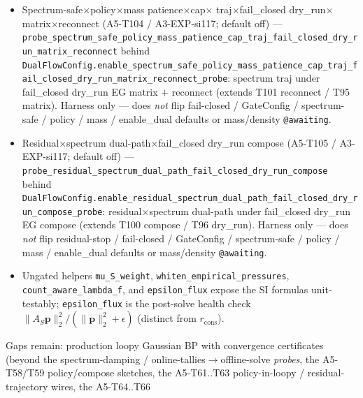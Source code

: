 \documentclass[11pt]{article}
\begin{document}
\begin{itemize}[leftmargin=1.5em]
  traj compose (A5-T103 / A3-EXP-si117; default off) ---
  \texttt{probe\_residual\_spectrum\_dual\_path\_patience\_cap\_traj\_compose}
  behind
  \texttt{DualFlowConfig.enable\_residual\_spectrum\_dual\_path\_patience\_cap\_traj\_compose\_probe}:
  residual$\times$spectrum dual-path patience$\times$cap under traj
  compose (extends T100 fail\_closed compose). Harness only --- does
  \emph{not} flip residual-stop / fail-closed / GateConfig /
  spectrum-safe / policy / mass / enable\_dual defaults or
  mass/density \texttt{@awaiting}.
  \item Spectrum-safe$\times$policy$\times$mass patience$\times$cap$\times$
  traj$\times$fail\_closed dry\_run$\times$matrix$\times$reconnect
  (A5-T104 / A3-EXP-si117; default off) ---
  \texttt{probe\_spectrum\_safe\_policy\_mass\_patience\_cap\_traj\_fail\_closed\_dry\_run\_matrix\_reconnect}
  behind
  \texttt{DualFlowConfig.enable\_spectrum\_safe\_policy\_mass\_patience\_cap\_traj\_fail\_closed\_dry\_run\_matrix\_reconnect\_probe}:
  spectrum traj under fail\_closed dry\_run EG matrix $+$ reconnect
  (extends T101 reconnect / T95 matrix). Harness only --- does
  \emph{not} flip fail-closed / GateConfig / spectrum-safe / policy /
  mass / enable\_dual defaults or mass/density \texttt{@awaiting}.
  \item Residual$\times$spectrum dual-path$\times$fail\_closed dry\_run
  compose (A5-T105 / A3-EXP-si117; default off) ---
  \texttt{probe\_residual\_spectrum\_dual\_path\_fail\_closed\_dry\_run\_compose}
  behind
  \texttt{DualFlowConfig.enable\_residual\_spectrum\_dual\_path\_fail\_closed\_dry\_run\_compose\_probe}:
  residual$\times$spectrum dual-path under fail\_closed dry\_run EG
  compose (extends T100 compose / T96 dry\_run). Harness only --- does
  \emph{not} flip residual-stop / fail-closed / GateConfig /
  spectrum-safe / policy / mass / enable\_dual defaults or
  mass/density \texttt{@awaiting}.
  \item Ungated helpers \texttt{mu\_S\_weight}, \texttt{whiten\_empirical\_pressures},
  \texttt{count\_aware\_lambda\_f}, and \texttt{epsilon\_flux} expose the SI
  formulas unit-testably; \texttt{epsilon\_flux} is the post-solve health check
  $\|A_S\mathbf p\|_2^2/(\|\mathbf p\|_2^2+\epsilon)$ (distinct from
  $r_{\mathrm{cons}}$).
\end{itemize}
Gaps remain: production loopy Gaussian BP with convergence certificates
(beyond the spectrum-damping / online-tallies$\to$offline-solve
\emph{probes}, the A5-T58/T59 policy/compose sketches, the A5-T61..T63
policy-in-loopy / residual-trajectory wires, the A5-T64..T66
\end{document}
